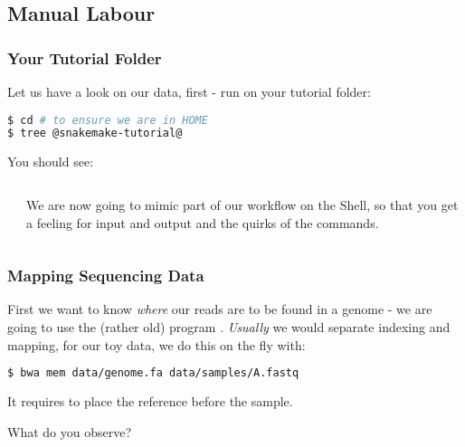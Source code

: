 \subsection{Manual Labour}

\begin{frame}[fragile]
	\frametitle{Your Tutorial Folder}
	Let us have a look on our data, first - run  on your tutorial folder:
	\begin{lstlisting}[language=Bash, style=Shell]
$ cd # to ensure we are in HOME
$ tree @snakemake-tutorial@
    \end{lstlisting}
    You should see:
    \begin{columns}
    	\begin{column}{0.5\textwidth}
    		
    		\begin{minipage}[t]{0.5\textwidth}
    			{\tiny \DTsetlength{0.2em}{1em}{0.2em}{0.4pt}{.6pt}
    				}
    		\end{minipage}
    	\end{column}
    	\begin{column}{0.5\textwidth}
    		\pause
    		\begin{task}
    			We are now going to mimic part of our workflow on the Shell, so that you get a feeling for input and output and the quirks of the commands.
    		\end{task}
    	\end{column}
    \end{columns}
\end{frame}

\begin{frame}[fragile]
  \frametitle{Mapping Sequencing Data}
  \begin{task}
  	First we want to know \emph{where} our reads are to be found in a genome - we are going to use the (rather old) program .\newline
  	\emph{Usually} we would separate indexing and mapping, for our toy data, we do this on the fly with:
  \end{task}
  \pause
  	\begin{lstlisting}[language=Bash, style=Shell]
$ bwa mem data/genome.fa data/samples/A.fastq
    \end{lstlisting}
    It requires to place the reference before the sample.
    \begin{question}
    	What do you observe?
    \end{question}
\end{frame}

